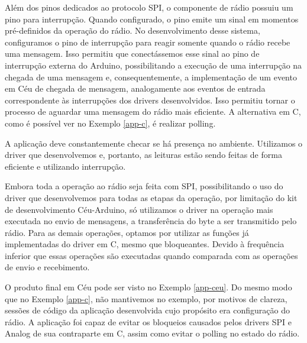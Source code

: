 \documentclass[11pt]{article}
\begin{document}
\par Além dos pinos dedicados ao protocolo SPI, o componente de rádio possuiu um pino para interrupção. Quando configurado, o pino emite um sinal em momentos pré-definidos da operação do rádio. No desenvolvimento desse sistema, configuramos o pino de interrupção para reagir somente quando o rádio recebe uma mensagem. Isso permitiu que conectássemos esse sinal ao pino de interrupção externa do Arduino, possibilitando a execução de uma interrupção na chegada de uma mensagem e, consequentemente, a implementação de um evento em Céu de chegada de mensagem, analogamente aos eventos de entrada correspondente às interrupções dos drivers desenvolvidos. Isso permitiu tornar o processo de aguardar uma mensagem do rádio mais eficiente. A alternativa em C, como é possível ver no Exemplo \ref{app-c}, é realizar polling.
\par A aplicação deve constantemente checar se há presença no ambiente. Utilizamos o driver que desenvolvemos e, portanto, as leituras estão sendo feitas de forma eficiente e utilizando interrupção.
\par Embora toda a operação ao rádio seja feita com SPI, possibilitando o uso do driver que desenvolvemos para todas as etapas da operação, por limitação do kit de desenvolvimento Céu-Arduino, só utilizamos o driver na operação mais executada no envio de mensagens, a transferência do byte a ser transmitido pelo rádio. Para as demais operações, optamos por utilizar as funções já implementadas do driver em C, mesmo que bloqueantes. Devido à frequência inferior que essas operações são executadas quando comparada com as operações de envio e recebimento. 
\par O produto final em Céu pode ser visto no Exemplo \ref{app-ceu}. Do mesmo modo que no Exemplo \ref{app-c}, não mantivemos no exemplo, por motivos de clareza, sessões de código da aplicação desenvolvida cujo propósito era configuração do rádio. A aplicação foi capaz de evitar os bloqueios causados pelos drivers SPI e Analog de sua contraparte em C, assim como evitar o polling no estado do rádio.
\end{document}
